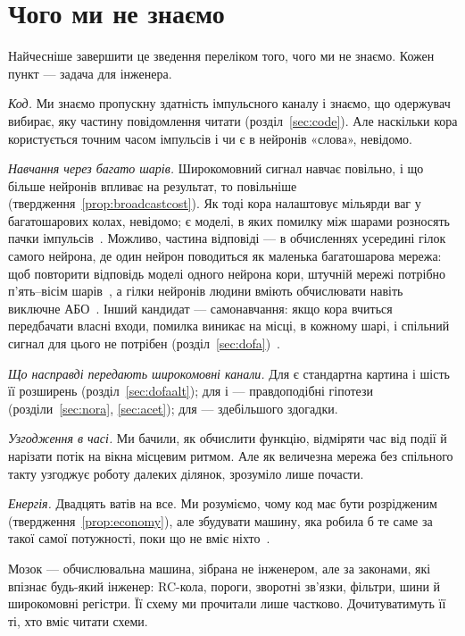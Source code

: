 \section{Чого ми не знаємо}

Найчесніше завершити це зведення переліком того, чого ми не знаємо. Кожен пункт --- задача для інженера.

\emph{Код.} Ми знаємо пропускну здатність імпульсного каналу і знаємо, що одержувач вибирає, яку частину повідомлення читати (розділ~\ref{sec:code}). Але наскільки кора користується точним часом імпульсів і чи є в нейронів «слова», невідомо.

\emph{Навчання через багато шарів.} Широкомовний сигнал навчає повільно, і що більше нейронів впливає на результат, то повільніше (твердження~\ref{prop:broadcastcost}). Як тоді кора налаштовує мільярди ваг у багатошарових колах, невідомо; є моделі, в яких помилку між шарами розносять пачки імпульсів~\cite{Payeur2021}. Можливо, частина відповіді --- в обчисленнях усередині гілок самого нейрона, де один нейрон поводиться як маленька багатошарова мережа: щоб повторити відповідь моделі одного нейрона кори, штучній мережі потрібно п'ять--вісім шарів~\cite{Beniaguev2021}, а гілки нейронів людини вміють обчислювати навіть виключне АБО~\cite{Gidon2020}. Інший кандидат --- самонавчання: якщо кора вчиться передбачати власні входи, помилка виникає на місці, в кожному шарі, і спільний сигнал для цього не потрібен (розділ~\ref{sec:dofa})~\cite{Keller2018}.

\emph{Що насправді передають широкомовні канали.} Для  є стандартна картина і шість її розширень (розділ~\ref{sec:dofaalt}); для  і  --- правдоподібні гіпотези (розділи~\ref{sec:nora}, \ref{sec:acet}); для  --- здебільшого здогадки.

\emph{Узгодження в часі.} Ми бачили, як обчислити функцію, відміряти час від події й нарізати потік на вікна місцевим ритмом. Але як величезна мережа без спільного такту узгоджує роботу далеких ділянок, зрозуміло лише почасти.

\emph{Енергія.} Двадцять ватів на все. Ми розуміємо, чому код має бути розрідженим (твердження~\ref{prop:economy}), але збудувати машину, яка робила б те саме за такої самої потужності, поки що не вміє ніхто~\cite{MehonicKenyon2022}.

Мозок --- обчислювальна машина, зібрана не інженером, але за законами, які впізнає будь-який інженер: RC-кола, пороги, зворотні зв'язки, фільтри, шини й широкомовні регістри. Її схему ми прочитали лише частково. Дочитуватимуть її ті, хто вміє читати схеми.

